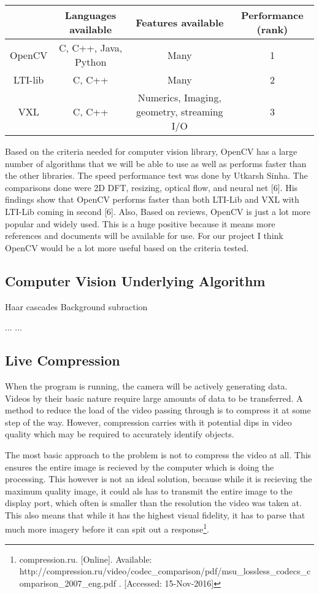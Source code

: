 \documentclass[letterpaper,10pt,onecolumn,draftclsnofoot]{IEEEtran}
\begin{document}
\begin{center}
	\begin{tabular}{|c|c|c|c|}
		
		\hline
		\textbf{} & \textbf{Languages available} & \textbf{Features available} & \textbf{Performance (rank)} \\
		\hline
		OpenCV & C, C++, Java, Python & Many & 1 \\
		\hline
		LTI-lib & C, C++ & Many & 2 \\
		\hline
		VXL & C, C++ & Numerics, Imaging, geometry, streaming I/O & 3 \\
		\hline
		
	\end{tabular}
\end{center}

Based on the criteria needed for computer vision library, OpenCV has a large number of algorithms that we will be able to use as well as performs faster than the other libraries.
The speed performance test was done by Utkarsh Sinha.
The comparisons done were 2D DFT, resizing, optical flow, and neural net [6].
His findings show that OpenCV performs faster than both LTI-Lib and VXL with LTI-Lib coming in second [6].
Also, Based on reviews, OpenCV is just a lot more popular and widely used.
This is a huge positive because it means more references and documents will be available for use.
For our project I think OpenCV would be a lot more useful based on the criteria tested.

\newpage
\subsection{Computer Vision Underlying Algorithm} %

Haar cascades
Background subraction

...
...

\newpage
\subsection{Live Compression} %

When the program is running, the camera will be actively generating data.  Videos by their basic nature require large amounts of data to be transferred.  A method to reduce the load of the video passing through is to compress it at some step of the way.  However, compression carries with it potential dips in video quality which may be required to accurately identify objects.

The most basic approach to the problem is not to compress the video at all.  This ensures the entire image is recieved by the computer which is doing the processing.  This however is not an ideal solution, because while it is recieving the maximum quality image, it could als has to transmit the entire image to the display port, which often is smaller than the resolution the video was taken at.  This also means that while it has the highest visual fidelity, it has to parse that much more imagery before it can spit out a response\footnote{compression.ru. [Online]. Available: http://compression.ru/video/codec\_comparison/pdf/msu\_lossless\_codecs\_comparison\_2007\_eng.pdf . [Accessed: 15-Nov-2016] }. 
\end{document}
